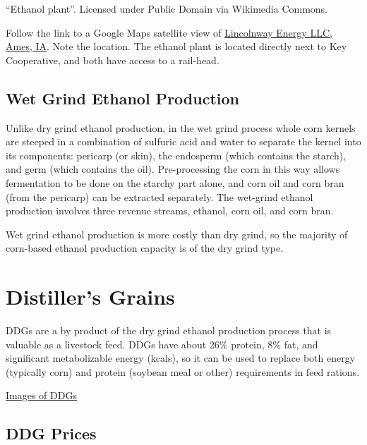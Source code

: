 \documentclass[
  letterpaper,
  DIV=11,
  numbers=noendperiod]{scrreprt}
\begin{document}
``Ethanol plant''. Licensed under Public Domain via Wikimedia Commons.

Follow the link to a Google Maps satellite view of
\href{https://www.google.com/maps/place/Lincolnway+Energy+LLC/@42.0259566,-93.5094383,1084m/data=!3m1!1e3!4m2!3m1!1s0x0000000000000000:0xe75269d9c81692ab!6m1!1e1}{Lincolnway
Energy LLC, Ames, IA}. Note the location. The ethanol plant is located
directly next to Key Cooperative, and both have access to a rail-head.

\hypertarget{wet-grind-ethanol-production}{%
\subsection{Wet Grind Ethanol
Production}\label{wet-grind-ethanol-production}}

Unlike dry grind ethanol production, in the wet grind process whole corn
kernels are steeped in a combination of sulfuric acid and water to
separate the kernel into its components: pericarp (or skin), the
endosperm (which contains the starch), and germ (which contains the
oil). Pre-processing the corn in this way allows fermentation to be done
on the starchy part alone, and corn oil and corn bran (from the
pericarp) can be extracted separately. The wet-grind ethanol production
involves three revenue streams, ethanol, corn oil, and corn bran.

Wet grind ethanol production is more costly than dry grind, so the
majority of corn-based ethanol production capacity is of the dry grind
type.

\hypertarget{distillers-grains}{%
\section{Distiller's Grains}\label{distillers-grains}}

DDGs are a by product of the dry grind ethanol production process that
is valuable as a livestock feed. DDGs have about 26\% protein, 8\% fat,
and significant metabolizable energy (kcals), so it can be used to
replace both energy (typically corn) and protein (soybean meal or other)
requirements in feed rations.

\href{https://www.google.com/search?q=ddgs\&source=lnms\&tbm=isch\&sa=X\&ved=0ahUKEwj4udmomr7JAhWF2B4KHailApcQ_AUICCgC\&biw=1920\&bih=1031\#}{Images
of DDGs}

\hypertarget{ddg-prices}{%
\subsection{DDG Prices}\label{ddg-prices}}
\end{document}

